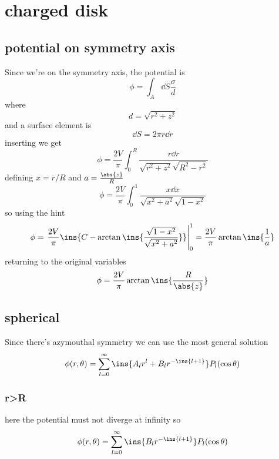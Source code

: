 \clearpage
\section{charged disk}
\subsection{potential on symmetry axis}
Since we're on the symmetry axis, the potential is 
\begin{equation}
	\phi = \int_A \dd{S}\frac{\sigma}{d}
\end{equation}
where 
\begin{equation}
	d = \sqrt{r^2+z^2}
\end{equation}
and a surface element is 
\begin{equation}
	\dd{S} = 2\pi r \dd{r}
\end{equation}
inserting we get 
\begin{equation}
	\phi = \frac{2V}{\pi}\int_{0}^{R}\frac{r\dd{r}}{\sqrt{r^2+z^2}\sqrt{R^2-r^2}}
\end{equation}
defining \(x=r/R\) and \(a=\frac{\abs{z}}{R}\)
\begin{equation}
	\phi = \frac{2V}{\pi}\int_{0}^{1}\frac{x\dd{x}}{\sqrt{x^2+a^2}\sqrt{1-x^2}}
\end{equation}
so using the hint 
\begin{equation}
	\phi = \left.\frac{2V}{\pi}\ins{C-\arctan\ins{\frac{\sqrt{1-x^2}}{\sqrt{x^2+a^2}}}}\right|_0^1=\frac{2V}{\pi}\arctan\ins{\frac{1}{a}}
\end{equation}
returning to the original variables
\begin{equation}
	\phi = \frac{2V}{\pi}\arctan\ins{\frac{R}{\abs{z}}}
\end{equation}
\subsection{spherical}
Since there's azymouthal symmetry we can use the most general solution
\begin{equation}
	\phi(r,\theta) = \sum_{l=0}^{\infty}\ins{A_l r^l + B_l r^{-\ins{l+1}}}P_l(\cos\theta)
\end{equation}
\subsubsection{r>R}
here the potential must not diverge at infinity so 
\begin{equation}
	\phi(r,\theta) = \sum_{l=0}^{\infty}\ins{B_l r^{-\ins{l+1}}}P_l(\cos\theta)
\end{equation}
